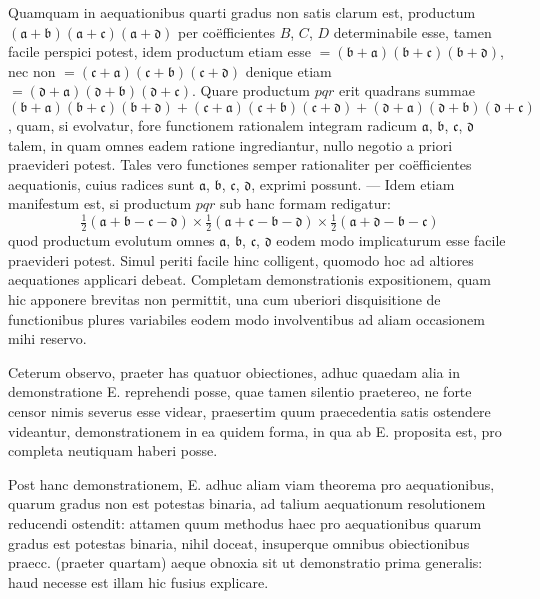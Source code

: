 \documentclass[twoside,12pt, showframe]{memoir}
\begin{document}
Quamquam in aequationibus quarti gradus non satis clarum est, productum \( (\mathfrak{a} + \mathfrak{b})(\mathfrak{a} + \mathfrak{c})(\mathfrak{a} + \mathfrak{d})\) per co\"efficientes \(B\), \(C\), \(D\) determinabile esse, tamen facile perspici potest, idem productum etiam esse \(= (\mathfrak{b} + \mathfrak{a})(\mathfrak{b} + \mathfrak{c})(\mathfrak{b} + \mathfrak{d})\), nec non \( = (\mathfrak{c} + \mathfrak{a})(\mathfrak{c} + \mathfrak{b})(\mathfrak{c} + \mathfrak{d})\) denique etiam \( = (\mathfrak{d} + \mathfrak{a})(\mathfrak{d} + \mathfrak{b})(\mathfrak{d} + \mathfrak{c})\). Quare productum \(pqr\) erit quadrans summae \((\mathfrak{b} + \mathfrak{a})(\mathfrak{b} + \mathfrak{c})(\mathfrak{b} + \mathfrak{d})+(\mathfrak{c} + \mathfrak{a})(\mathfrak{c} + \mathfrak{b})(\mathfrak{c} + \mathfrak{d})+(\mathfrak{d} + \mathfrak{a})(\mathfrak{d} + \mathfrak{b})(\mathfrak{d} + \mathfrak{c})\), quam, si evolvatur, fore functionem rationalem integram radicum \(\mathfrak{a}\), \(\mathfrak{b}\), \(\mathfrak{c}\), \(\mathfrak{d}\) talem, in quam omnes eadem ratione ingrediantur, nullo negotio a priori praevideri potest.  Tales vero functiones semper rationaliter per co\"efficientes aequationis, cuius radices sunt \(\mathfrak{a}\), \(\mathfrak{b}\), \(\mathfrak{c}\), \(\mathfrak{d}\), exprimi possunt. — Idem etiam manifestum est, si productum \(pqr\)  sub hanc formam redigatur:
\[ \tfrac{1}{2}\left( \mathfrak{a} + \mathfrak{b} - \mathfrak{c} - \mathfrak{d}  \right) \times  \tfrac{1}{2}\left( \mathfrak{a} + \mathfrak{c} - \mathfrak{b} - \mathfrak{d}  \right)  \times  \tfrac{1}{2}\left( \mathfrak{a} + \mathfrak{d} - \mathfrak{b} - \mathfrak{c}  \right)  \]
quod productum evolutum omnes \(\mathfrak{a}\), \(\mathfrak{b}\), \(\mathfrak{c}\), \(\mathfrak{d}\) eodem modo implicaturum esse facile praevideri potest.   Simul periti facile hinc colligent, quomodo hoc ad altiores aequationes applicari debeat.   Completam demonstrationis expositionem, quam hic apponere brevitas non permittit, una cum uberiori disquisitione de functionibus plures variabiles eodem modo involventibus ad aliam occasionem mihi reservo.

Ceterum observo, praeter has quatuor obiectiones, adhuc quaedam alia in demonstratione \textsc{E.} reprehendi posse, quae tamen silentio praetereo, ne forte censor nimis severus esse videar, praesertim quum praecedentia satis ostendere videantur, demonstrationem in ea quidem forma, in qua ab \textsc{E.} proposita est, pro completa neutiquam haberi posse.

Post hanc demonstrationem, \textsc{E.} adhuc aliam viam theorema pro aequationibus, quarum gradus non est potestas binaria, ad talium aequationum resolutionem reducendi ostendit: attamen quum methodus haec pro aequationibus quarum gradus est potestas binaria, nihil doceat, insuperque omnibus obiectionibus praecc. (praeter quartam) aeque obnoxia sit ut demonstratio prima generalis: haud necesse est illam hic fusius explicare.
 
\end{document}
